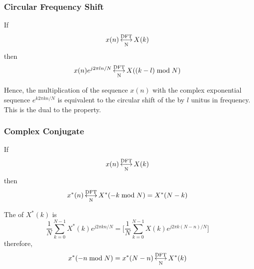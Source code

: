 \subsubsection{Circular Frequency Shift}\label{subsubsec:DFT_Properties-Circular_Frequency_Shift}
If
\begin{equation*}
  x(n) \operatorname{\overset{\text{DFT}}{\underset{N}{\longleftrightarrow}}} X(k)
\end{equation*}
then
\begin{equation}\label{eq:DFT_Properties-Circular_Frequency_Shift}
  x(n)e^{j 2\pi l n/N} \operatorname{\overset{\text{DFT}}{\underset{N}{\longleftrightarrow}}} X((k-l) \bmod N)
\end{equation}

Hence, the multiplication of the sequence $x(n)$ with the complex exponential sequence $e^{k 2\pi k n/N}$ is equivalent to the circular shift of the  by $l$ unitus in frequency.
This is the dual to the  property.

\subsubsection{Complex Conjugate}\label{subsubsec:DFT_Properties-Complex_Conjugate}
If
\begin{equation*}
  x(n) \operatorname{\overset{\text{DFT}}{\underset{N}{\longleftrightarrow}}} X(k)
\end{equation*}
then
\begin{equation}\label{eq:DFT_Properties-Complex_Conjugate}
  x^{*}(n) \operatorname{\overset{\text{DFT}}{\underset{N}{\longleftrightarrow}}} X^{*}(-k \bmod N) = X^{*}(N-k)
\end{equation}

The  of $X^{*}(k)$ is
\begin{equation*}
  \frac{1}{N} \sum\limits_{k=0}^{N-1} X^{*}(k)e^{j 2\pi k n/N} = \Biggl[ \frac{1}{N} \sum\limits_{k=0}^{N-1} X(k) e^{j 2\pi k (N-n)/N} \Biggr]
\end{equation*}
therefore,
\begin{equation}\label{eq:DFT_Properties-IDFT_Complex_Conjugate}
  x^{*}(-n \bmod N) = x^{*}(N-n) \operatorname{\overset{\text{DFT}}{\underset{N}{\longleftrightarrow}}} X^{*}(k)
\end{equation}

